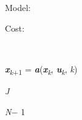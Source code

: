\documentclass[12pt,twoside]{article}
\begin{document}
\vspace{\baselineskip}
\begin{multicols}{2}
{\fontsize{10pt}{12.0pt}\selectfont Model:\par}\par


\vspace{\baselineskip}

\vspace{\baselineskip}
{\fontsize{10pt}{12.0pt}\selectfont Cost:\par}\par

\\

\vspace{\baselineskip}\begin{FlushLeft}
{\fontsize{10pt}{12.0pt}\selectfont \textbf{\textit{x}}\textit{\textsubscript{k}}\textsubscript{+1} = \textbf{\textit{a}}(\textbf{\textit{x}}\textit{\textsubscript{k}}, \textbf{\textit{u}}\textit{\textsubscript{k}}, \textit{k})\par}
\end{FlushLeft}\par


\vspace{\baselineskip}
\begin{FlushLeft}
{\fontsize{10pt}{12.0pt}\selectfont \textit{J \tabto{1.78in} }{\fontsize{7pt}{8.4pt}\selectfont \textit{N}$-$ 1\par}\par}
\end{FlushLeft}\par


\vspace{\baselineskip}

\end{multicols}
\end{document}
